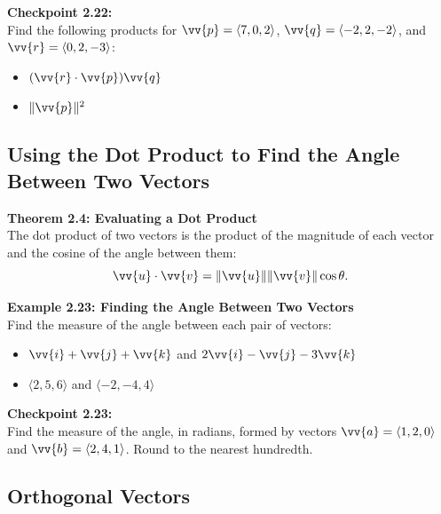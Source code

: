 \documentclass{article}
\begin{document}
\begin{exercisebox}
    \textbf{Checkpoint 2.22:} \\
    Find the following products for \(\vv{p} = \langle 7, 0, 2 \rangle\), \(\vv{q} = \langle -2, 2, -2 \rangle\), and \(\vv{r} = \langle 0, 2, -3 \rangle\):
    \begin{itemize}
        \item \((\vv{r} \cdot \vv{p}) \vv{q}\)
        \item \(\|\vv{p}\|^2\)
    \end{itemize}
\end{exercisebox}

\subsection*{Using the Dot Product to Find the Angle Between Two Vectors}

\begin{theorembox}
    \textbf{Theorem 2.4: Evaluating a Dot Product} \\
    The dot product of two vectors is the product of the magnitude of each vector and the cosine of the angle between them:
    \[
    \vv{u} \cdot \vv{v} = \|\vv{u}\| \|\vv{v}\| \cos \theta.
    \]
\end{theorembox}

\begin{examplebox}
    \textbf{Example 2.23: Finding the Angle Between Two Vectors} \\
    Find the measure of the angle between each pair of vectors:
    \begin{itemize}
        \item \(\vv{i} + \vv{j} + \vv{k}\) and \(2\vv{i} - \vv{j} - 3\vv{k}\)
        \item \(\langle 2, 5, 6 \rangle\) and \(\langle -2, -4, 4 \rangle\)
    \end{itemize}
\end{examplebox}

\begin{exercisebox}
    \textbf{Checkpoint 2.23:} \\
    Find the measure of the angle, in radians, formed by vectors \(\vv{a} = \langle 1, 2, 0 \rangle\) and \(\vv{b} = \langle 2, 4, 1 \rangle\). Round to the nearest hundredth.
\end{exercisebox}

\subsection*{Orthogonal Vectors}
\end{document}
